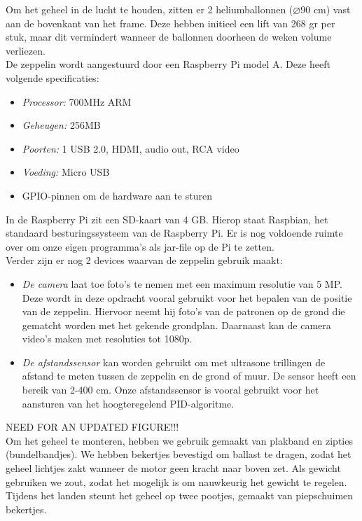 \documentclass[tt]{penoverslag}
\begin{document}
Om het geheel in de lucht te houden, zitten er 2 heliumballonnen ($\diameter$90 cm) vast aan de bovenkant van het frame. Deze hebben initieel een lift van 268 gr per stuk, maar dit vermindert wanneer de ballonnen doorheen de weken volume verliezen. \\

De zeppelin wordt aangestuurd door een Raspberry Pi model A. Deze heeft volgende specificaties:
\begin{itemize}
\item \emph{Processor:} 700MHz ARM
\item \emph{Geheugen:} 256MB
\item \emph{Poorten:} 1 USB 2.0, HDMI, audio out, RCA video
\item \emph{Voeding:} Micro USB
\item GPIO-pinnen om de hardware aan te sturen
\end{itemize}

In de Raspberry Pi zit een SD-kaart van 4 GB. Hierop staat Raspbian, het standaard besturingssysteem van de Raspberry Pi. Er is nog voldoende ruimte over om onze eigen programma's als jar-file op de Pi te zetten. \\

Verder zijn er nog 2 devices waarvan de zeppelin gebruik maakt:
\begin{itemize}
\item \emph{De camera} laat toe foto's te nemen met een maximum resolutie van 5 MP. Deze wordt in deze opdracht vooral gebruikt voor het bepalen van de positie van de zeppelin. Hiervoor neemt hij foto's van de patronen op de grond die gematcht worden met het gekende grondplan. Daarnaast kan de camera video's maken met resoluties tot 1080p.
\item \emph{De afstandssensor} kan worden gebruikt om met ultrasone trillingen de afstand te meten tussen de zeppelin en de grond of muur. De sensor heeft een bereik van 2-400 cm. Onze afstandssensor is vooral gebruikt voor het aansturen van het hoogteregelend PID-algoritme.  \\
\end{itemize}


{\Large NEED FOR AN UPDATED FIGURE!!! }\\

Om het geheel te monteren, hebben we gebruik gemaakt van plakband en zipties (bundelbandjes). We hebben bekertjes bevestigd om ballast te dragen, zodat het geheel lichtjes zakt wanneer de motor geen kracht naar boven zet. Als gewicht gebruiken we zout, zodat het mogelijk is om nauwkeurig het gewicht te regelen. Tijdens het landen steunt het geheel op twee pootjes, gemaakt van piepschuimen bekertjes. \\
\end{document}
